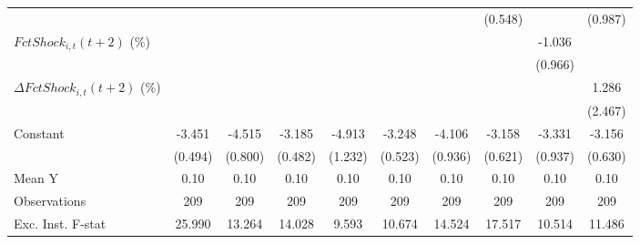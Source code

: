 {\begin{tabular}{l*{9}{c}}
                    &                     &                     &                     &                     &                     &                     &     (0.548)         &                     &     (0.987)         \\
\addlinespace
$ FctShock_{i,t}(t+2)$ (\%)&                     &                     &                     &                     &                     &                     &                     &      -1.036         &                     \\
                    &                     &                     &                     &                     &                     &                     &                     &     (0.966)         &                     \\
\addlinespace
$ \Delta FctShock_{i,t}(t+2)$ (\%)&                     &                     &                     &                     &                     &                     &                     &                     &       1.286         \\
                    &                     &                     &                     &                     &                     &                     &                     &                     &     (2.467)         \\
\addlinespace
Constant            &      -3.451\sym{***}&      -4.515\sym{***}&      -3.185\sym{***}&      -4.913\sym{***}&      -3.248\sym{***}&      -4.106\sym{***}&      -3.158\sym{***}&      -3.331\sym{***}&      -3.156\sym{***}\\
                    &     (0.494)         &     (0.800)         &     (0.482)         &     (1.232)         &     (0.523)         &     (0.936)         &     (0.621)         &     (0.937)         &     (0.630)         \\
\midrule
Mean Y              &        0.10         &        0.10         &        0.10         &        0.10         &        0.10         &        0.10         &        0.10         &        0.10         &        0.10         \\
Observations        &         209         &         209         &         209         &         209         &         209         &         209         &         209         &         209         &         209         \\
Exc. Inst. F-stat   &      25.990         &      13.264         &      14.028         &       9.593         &      10.674         &      14.524         &      17.517         &      10.514         &      11.486         \\
\bottomrule
\end{tabular}
}
